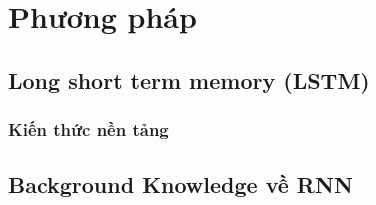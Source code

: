 




\chapter{Phương pháp}
\section{Long short term memory (LSTM)}
\subsection{Kiến thức nền tảng}
\section{Background Knowledge về RNN}

